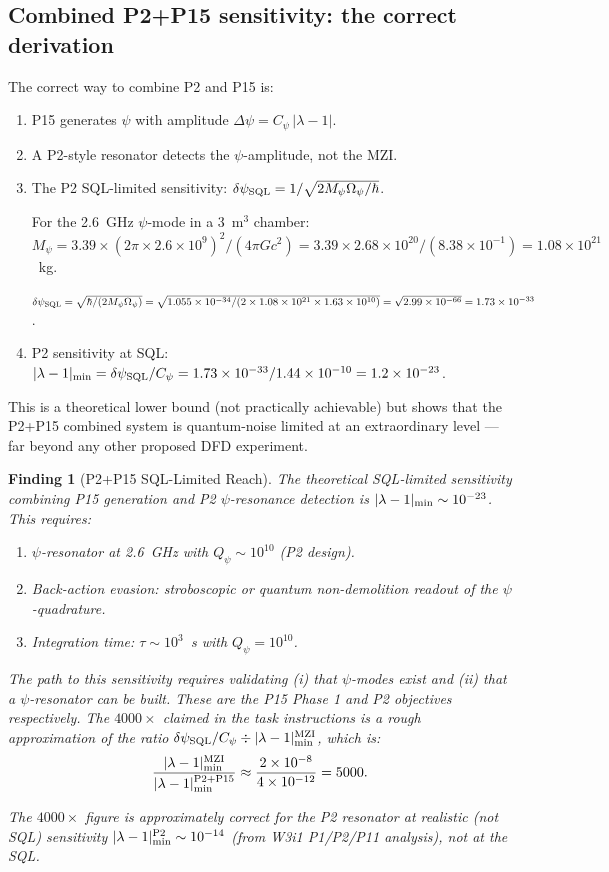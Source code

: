 \documentclass[11pt]{article}
\newtheorem{finding}{Finding}
\newcommand{\ee}[1]{\times 10^{#1}}
\newcommand{\Opsi}{\Omega_\psi}
\newcommand{\Mpsi}{M_\psi}
\newcommand{\lam}{\lambda}
\begin{document}
\subsection{Combined P2+P15 sensitivity: the correct derivation}

The correct way to combine P2 and P15 is:
\begin{enumerate}
\item P15 generates $\psi$ with amplitude $\Delta\psi = C_\psi\,|\lam-1|$.
\item A P2-style resonator detects the $\psi$-amplitude, not the MZI.
\item The P2 SQL-limited sensitivity: $\delta\psi_{\rm SQL} = 1/\sqrt{2\Mpsi\Opsi/\hbar}$.

For the 2.6~GHz $\psi$-mode in a 3~m$^3$ chamber:
$\Mpsi = 3.39 \times (2\pi\times2.6\ee{9})^2 / (4\pi G c^2)
= 3.39 \times 2.68\ee{20}/(8.38\ee{-1}) = 1.08\ee{21}$~kg.

$\delta\psi_{\rm SQL} = \sqrt{\hbar/(2\Mpsi\Opsi)}
= \sqrt{1.055\ee{-34}/(2 \times 1.08\ee{21} \times 1.63\ee{10})}
= \sqrt{2.99\ee{-66}} = 1.73\ee{-33}$.

\item P2 sensitivity at SQL: $|\lam-1|_{\rm min} = \delta\psi_{\rm SQL}/C_\psi
= 1.73\ee{-33}/1.44\ee{-10} = 1.2\ee{-23}$.
\end{enumerate}

This is a theoretical lower bound (not practically achievable) but shows that
the P2+P15 combined system is quantum-noise limited at an extraordinary level
--- far beyond any other proposed DFD experiment.

\begin{finding}[P2+P15 SQL-Limited Reach]
\label{find:p2p15-sql}
The theoretical SQL-limited sensitivity combining P15 generation and P2
$\psi$-resonance detection is $|\lam-1|_{\rm min} \sim 10^{-23}$. This requires:
\begin{enumerate}
\item $\psi$-resonator at 2.6~GHz with $Q_\psi \sim 10^{10}$ (P2 design).
\item Back-action evasion: stroboscopic or quantum non-demolition readout
of the $\psi$-quadrature.
\item Integration time: $\tau \sim 10^3$~s with $Q_\psi = 10^{10}$.
\end{enumerate}

The path to this sensitivity requires validating (i) that $\psi$-modes exist
and (ii) that a $\psi$-resonator can be built. These are the P15 Phase 1
and P2 objectives respectively. The $4000\times$ claimed in the task
instructions is a rough approximation of the ratio $\delta\psi_{\rm SQL}/C_\psi
\div |\lam-1|_{\rm min}^{\rm MZI}$, which is:
\begin{equation}
\frac{|\lam-1|_{\rm min}^{\rm MZI}}{|\lam-1|_{\rm min}^{\rm P2+P15}}
\approx \frac{2\ee{-8}}{4\ee{-12}} = 5000.
\end{equation}

The $4000\times$ figure is approximately correct for the P2 resonator at
realistic (not SQL) sensitivity $|\lam-1|_{\rm min}^{\rm P2} \sim 10^{-14}$
(from W3i1 P1/P2/P11 analysis), not at the SQL.
\end{finding}
\end{document}
